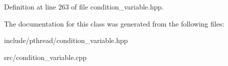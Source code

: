 Definition at line 263 of file condition\+\_\+variable.\+hpp.



The documentation for this class was generated from the following files\+:\begin{DoxyCompactItemize}
\item 
include/pthread/condition\+\_\+variable.\+hpp\item 
src/condition\+\_\+variable.\+cpp\end{DoxyCompactItemize}
